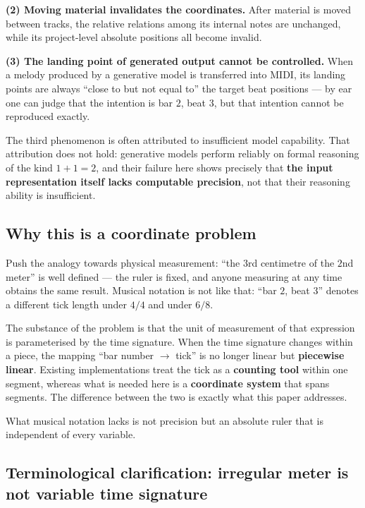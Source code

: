 \documentclass[11pt,a4paper]{article}
\begin{document}
\textbf{(2) Moving material invalidates the coordinates.} After material is moved
between tracks, the relative relations among its internal notes are unchanged, while
its project-level absolute positions all become invalid.

\textbf{(3) The landing point of generated output cannot be controlled.} When a melody
produced by a generative model is transferred into MIDI, its landing points are always
``close to but not equal to'' the target beat positions --- by ear one can judge that
the intention is bar $2$, beat $3$, but that intention cannot be reproduced exactly.

The third phenomenon is often attributed to insufficient model capability. That
attribution does not hold: generative models perform reliably on formal reasoning of
the kind $1+1=2$, and their failure here shows precisely that \textbf{the input
representation itself lacks computable precision}, not that their reasoning ability is
insufficient.

\subsection{Why this is a coordinate problem}

Push the analogy towards physical measurement: ``the $3$rd centimetre of the $2$nd
meter'' is well defined --- the ruler is fixed, and anyone measuring at any time
obtains the same result. Musical notation is not like that: ``bar $2$, beat $3$''
denotes a different tick length under $4/4$ and under $6/8$.

The substance of the problem is that the unit of measurement of that expression is
parameterised by the time signature. When the time signature changes within a piece,
the mapping ``bar number $\to$ tick'' is no longer linear but \textbf{piecewise
linear}. Existing implementations treat the tick as a \textbf{counting tool} within one
segment, whereas what is needed here is a \textbf{coordinate system} that spans
segments. The difference between the two is exactly what this paper addresses.

\begin{observation}
What musical notation lacks is not precision but an absolute ruler that is independent
of every variable.
\end{observation}

\subsection{Terminological clarification: irregular meter is not variable time signature}
\label{sec:terminology}
\end{document}

